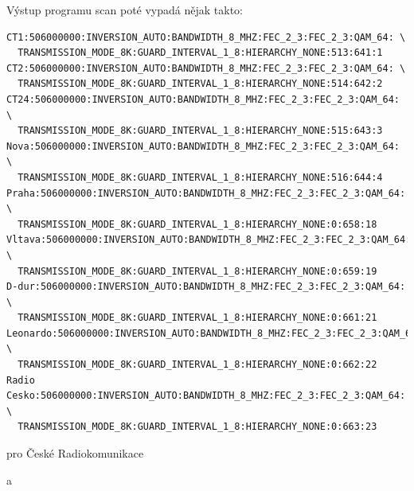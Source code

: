 \vspace{10pt}

Výstup programu scan poté vypadá nějak takto:
 
\vspace{10pt}

\begin{small}
\begin{verbatim}
CT1:506000000:INVERSION_AUTO:BANDWIDTH_8_MHZ:FEC_2_3:FEC_2_3:QAM_64: \
  TRANSMISSION_MODE_8K:GUARD_INTERVAL_1_8:HIERARCHY_NONE:513:641:1
CT2:506000000:INVERSION_AUTO:BANDWIDTH_8_MHZ:FEC_2_3:FEC_2_3:QAM_64: \
  TRANSMISSION_MODE_8K:GUARD_INTERVAL_1_8:HIERARCHY_NONE:514:642:2
CT24:506000000:INVERSION_AUTO:BANDWIDTH_8_MHZ:FEC_2_3:FEC_2_3:QAM_64: \
  TRANSMISSION_MODE_8K:GUARD_INTERVAL_1_8:HIERARCHY_NONE:515:643:3
Nova:506000000:INVERSION_AUTO:BANDWIDTH_8_MHZ:FEC_2_3:FEC_2_3:QAM_64: \
  TRANSMISSION_MODE_8K:GUARD_INTERVAL_1_8:HIERARCHY_NONE:516:644:4
Praha:506000000:INVERSION_AUTO:BANDWIDTH_8_MHZ:FEC_2_3:FEC_2_3:QAM_64: \
  TRANSMISSION_MODE_8K:GUARD_INTERVAL_1_8:HIERARCHY_NONE:0:658:18
Vltava:506000000:INVERSION_AUTO:BANDWIDTH_8_MHZ:FEC_2_3:FEC_2_3:QAM_64: \
  TRANSMISSION_MODE_8K:GUARD_INTERVAL_1_8:HIERARCHY_NONE:0:659:19
D-dur:506000000:INVERSION_AUTO:BANDWIDTH_8_MHZ:FEC_2_3:FEC_2_3:QAM_64: \
  TRANSMISSION_MODE_8K:GUARD_INTERVAL_1_8:HIERARCHY_NONE:0:661:21
Leonardo:506000000:INVERSION_AUTO:BANDWIDTH_8_MHZ:FEC_2_3:FEC_2_3:QAM_64: \
  TRANSMISSION_MODE_8K:GUARD_INTERVAL_1_8:HIERARCHY_NONE:0:662:22
Radio Cesko:506000000:INVERSION_AUTO:BANDWIDTH_8_MHZ:FEC_2_3:FEC_2_3:QAM_64: \
  TRANSMISSION_MODE_8K:GUARD_INTERVAL_1_8:HIERARCHY_NONE:0:663:23
\end{verbatim}
\end{small}

\vspace{10pt}

pro České Radiokomunikace

\vspace{10pt}

a

\vspace{10pt}

